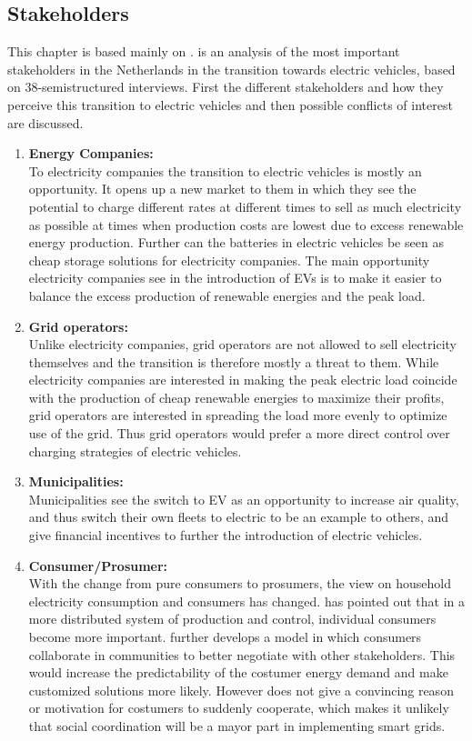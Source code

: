 \documentclass[a4paper]{article}
\begin{document}
\subsection{Stakeholders}
This chapter is based mainly on \cite{ev_stakeholder}. \cite{ev_stakeholder} is an analysis of the most important stakeholders in 
the  Netherlands in the transition towards electric vehicles, based on 38-semistructured interviews.
First the different stakeholders and how they perceive this 
transition to electric vehicles and then possible conflicts of interest are discussed.
\begin{enumerate}
 \item \textbf{Energy Companies:}\\
 To electricity companies the transition to electric vehicles is mostly an opportunity. It opens up a new market to them 
 in which they see the potential to charge different rates at different times to sell as much electricity as possible 
 at times when production costs are lowest due to excess renewable energy production. Further can the batteries in 
 electric vehicles be seen as cheap storage solutions for electricity companies. The main opportunity electricity 
 companies see in the introduction of EVs is to make it easier to balance the excess production of renewable energies
 and the peak load.
 \item \textbf{Grid operators:}\\
 Unlike electricity companies, grid operators are not allowed to sell electricity themselves and the transition is 
 therefore mostly a threat to them. While electricity companies are interested in making the peak electric load coincide
 with the production of cheap renewable energies to maximize their profits, grid operators are interested in spreading 
 the load more evenly to optimize use of the grid. Thus grid operators would prefer a more direct control over charging 
 strategies of electric vehicles. 
 \item \textbf{Municipalities:}\\
 Municipalities see the switch to EV as an opportunity to increase air quality, and thus switch their own fleets to 
 electric to be an example to others, and give financial incentives to further the introduction of electric vehicles. 
 \item \textbf{Consumer/Prosumer:}\\
 With the change from pure consumers to prosumers, the view on household electricity consumption and consumers has changed. 
 \cite{social_smart_grid} has pointed out that in a more distributed system of production and control, individual consumers 
 become more important. \cite{social_smart_grid} further develops a model in which consumers collaborate in communities 
 to better negotiate with other stakeholders. This would increase the predictability of the costumer energy demand and make 
 customized solutions more likely. However  \cite{social_smart_grid} does not give a convincing reason or motivation for costumers 
 to suddenly cooperate, which makes it unlikely that social coordination will be a mayor part in implementing smart grids. 
 
\end{enumerate}
\end{document}
